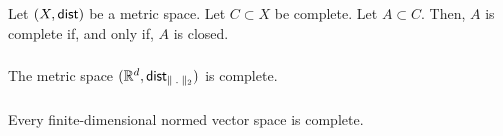 \subsubsection*{}
\uprop Let $(X, \mathsf{dist})$ be a metric space. Let $C \subset X$ be complete.
Let $A \subset C$. Then, $A$ is complete if, and only if, $A$ is closed.

\subsubsection*{}
\uprop The metric space $(\R^d, \dist_{\norm_2})$ is complete.

\subsubsection*{}
\uprop Every finite-dimensional normed vector space is complete.